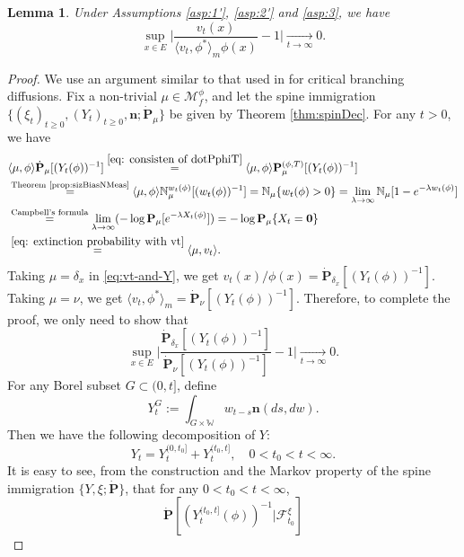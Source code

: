 \documentclass[UTF8]{pkuthss}
\theoremstyle{plain}
\newtheorem{lem}[thm]{Lemma}
\theoremstyle{definition}
\numberwithin{equation}{section}
\begin{document}
\begin{lem}\label{lem:Kolmogorov-1}
	Under Assumptions  \ref{asp:1'}, \ref{asp:2'} and \ref{asp:3}, we have
\[
	\sup_{x\in E}\Big | \frac{v_t(x)}{\langle v_t, \phi^*\rangle_m \phi(x)} - 1\Big |
	\xrightarrow[t\to\infty]{} 0.
\]
\end{lem}
\begin{proof}
	We use an argument similar to that used in \cite{Powell2016An-invariance} for critical branching diffusions.
Fix a non-trivial $\mu \in \mathcal M_f^\phi$, and let the spine
 immigration $\{(\xi_t)_{t\geq 0}, (Y_t)_{t\geq 0}, \mathbf n; \dot {\mathbf P}_\mu\}$ be given by Theorem \ref{thm:spinDec}.
For any $t > 0$, we have
\begin{align}\label{eq:vt-and-Y}
	&\langle \mu,\phi\rangle \dot {\mathbf P}_\mu [(Y_t(\phi))^{-1}]
	\overset{\eqref{eq: consisten of dotPphiT}}{=}
	\langle \mu,\phi\rangle \mathbf P^{(\phi,T)}_\mu [(Y_t(\phi))^{-1}]
	\\&\overset{\text{Theorem \ref{prop:sizBiasNMeas}}}{=} \langle \mu,\phi\rangle \mathbb N_\mu^{w_t(\phi)} [ (w_t(\phi))^{-1}]
	= \mathbb N_{\mu}\{w_t(\phi)>0\}
	= \lim_{\lambda \to \infty} \mathbb N_\mu[1-e^{-\lambda w_t(\phi)}]
	\\&\overset{\text{Campbell's formula}}{=} \lim_{\lambda \to \infty} (-\log \mathbf P_\mu[e^{-\lambda X_t(\phi)}])
	= -\log \mathbf P_{\mu} \{ X_t = \mathbf 0\} \\
	& \overset{\eqref{eq: extinction probability with vt}}{=} \langle \mu,v_t \rangle.
\end{align}
	Taking $\mu = \delta_x$ in \eqref{eq:vt-and-Y}, we get $v_t(x)/\phi(x)=\dot{\mathbf P}_{\delta_x}[(Y_t(\phi))^{-1}]$.
	Taking $\mu = \nu$, we get $\langle v_t, \phi^*\rangle_m = \dot {\mathbf P}_{\nu} [(Y_t(\phi))^{-1}]$.
	Therefore, to complete the proof, we only need to show that
\[
	\sup_{x\in E}\Big | \frac {\dot{\mathbf P}_{\delta_x}[(Y_t(\phi))^{-1}]} {\dot {\mathbf P}_\nu [(Y_t(\phi))^{-1}]}-1\Big|
	\xrightarrow[t\to\infty]{} 0.
\]
	For any Borel subset $G\subset (0,t]$, define
\[
	Y^G_t
	:= \int_{G\times \mathbb W} w_{t-s} \mathbf n(ds,dw).
\]
	Then we have the following decomposition of $Y$:
\begin{equation}\label{eq:decomposition-on-Y}
	Y_t
	= Y^{(0,t_0]}_t + Y^{(t_0,t]}_t,
	\quad 0 < t_0 < t < \infty.
\end{equation}
	It is easy to see, from the construction and the Markov property of the spine immigration $\{Y,\xi; \dot {\mathbf P}\}$, that for any $0 < t_0 < t < \infty$,
\[
	\dot{\mathbf P} [(Y_t^{(t_0,t]}(\phi))^{-1}|\mathscr F^\xi_{t_0}]
\]
\end{proof}
\end{document}
